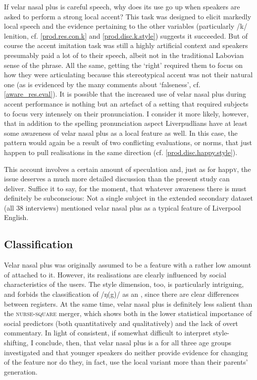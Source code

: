 If velar nasal plus is careful speech, why does its use go up when speakers are asked to perform a strong local accent?
This task was designed to elicit markedly local speech and the evidence pertaining to the other variables (particularly /k/ lenition, cf. \ref{prod.res.con.k} and \ref{prod.disc.k.style}) suggests it succeeded.
But of course the accent imitation task was still a highly artificial context and speakers presumably paid a lot of  to their speech, albeit not in the traditional Labovian sense of the phrase.
All the same, getting the  `right' required them to focus on how they were articulating because this stereotypical accent was not their natural one (as is evidenced by the many comments about `falseness', cf. \ref{aware_res.eval}).
It is possible that the increased use of velar nasal plus during accent performance is nothing but an artefact of a setting that required subjects to focus very intensely on their pronunciation.
I consider it more likely, however, that in addition to the spelling pronunciation aspect Liverpudlians have at least some awareness of velar nasal plus as a local feature as well.
In this case, the  pattern would again be a result of two conflicting evaluations, or norms, that just happen to pull realisations in the same direction (cf. \ref{prod.disc.happy.style}).

This account involves a certain amount of speculation and, just as for happ\textsc{y}, the issue deserves a much more detailed discussion than the present study can deliver.
Suffice it to say, for the moment, that whatever awareness there is must definitely be subconscious: Not a single subject in the extended secondary dataset (all 38 interviews) mentioned velar nasal plus as a typical feature of Liverpool English.

\subsection{Classification}
\label{prod.disc.ng.classification}

Velar nasal plus was originally assumed to be a feature with a rather low amount of  attached to it.
However, its realisations are clearly influenced by social characteristics of the users.
The style dimension, too, is particularly intriguing, and forbids the classification of /ŋ(g)/ as an , since there are clear differences between registers.
At the same time, velar nasal plus is definitely less salient than the \textsc{nurse}-\textsc{square} merger, which shows both in the lower statistical importance of social predictors (both quantitatively and qualitatively) and the lack of overt commentary.
In light of consistent, if somewhat difficult to interpret style-shifting, I conclude, then, that velar nasal plus is a  for all three age groups investigated and that younger speakers do neither provide evidence for changing  of the feature nor do they, in fact, use the local variant more than their parents' generation.

